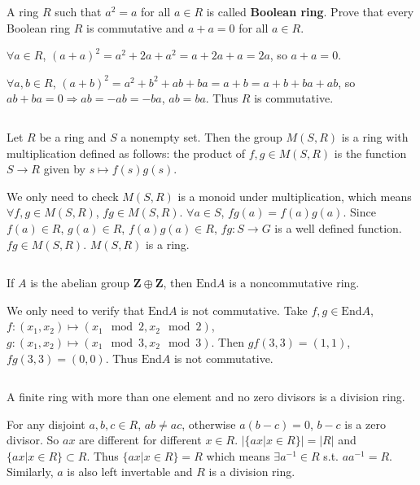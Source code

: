 $$ $$

\begin{ex}
    A ring $R$ such that $a^{2}=a$ for all $a\in R$ is called \textbf{Boolean ring}. Prove that every Boolean ring $R$ is commutative and $a+a=0$ for all $a\in R$.
\end{ex}

\begin{answer}
    $\forall a\in R$, $(a+a)^{2}=a^{2}+2a+a^{2}=a+2a+a=2a$, so $a+a=0$.

    $\forall a,b \in R$, $(a+b)^{2}=a^{2}+b^{2}+ab+ba=a+b=a+b+ba+ab$, so $ab+ba=0\Rightarrow ab=-ab=-ba$, $ab=ba$. Thus $R$ is commutative.
\end{answer}

$$ $$

\begin{ex}
    Let $R$ be a ring and $S$ a nonempty set. Then the group $M(S,R)$ is a ring with multiplication defined as follows: the product of $f, g\in M(S,R)$ is the function $S\to R$ given by $s\mapsto f(s)g(s)$.
\end{ex}

\begin{answer}
    We only need to check $M(S,R)$ is a monoid under multiplication, which means $\forall f,g\in M(S,R)$, $fg\in M(S,R)$. $\forall a\in S$, $fg(a)=f(a)g(a)$. Since $f(a)\in R$, $g(a)\in R$, $f(a)g(a)\in R$, $fg:S\to G$ is a  well defined function. $fg\in M(S,R)$. $M(S,R)$ is a ring.
\end{answer}

$$ $$

\begin{ex}
    If $A$ is the abelian group $\mathbf{Z}\oplus \mathbf{Z}$, then $\mathrm{End} A$ is a noncommutative ring.
\end{ex}

\begin{answer}
    We only need to verify that $\mathrm{End} A$ is not commutative. Take $f,g\in \mathrm{End}A$, $f:(x_{1},x_{2})\mapsto (x_{1}\mod 2, x_{2}\mod 2)$, $g:(x_{1}, x_{2})\mapsto (x_{1}\mod 3, x_{2}\mod 3)$. Then $gf(3,3)=(1,1)$, $fg(3,3)=(0,0)$. Thus $\mathrm{End} A$ is not commutative.
\end{answer}

$$ $$

\begin{ex}
    A finite ring with more than one element and no zero divisors is a division ring.
\end{ex}

\begin{answer}
    For any disjoint $a,b,c\in R$, $ab\neq ac$, otherwise $a(b-c)=0$, $b-c$ is a zero divisor. So $ax$ are different for different $x\in R$. $\left| \{ax|x\in R\} \right| =\left| R \right| $ and $\{ax|x\in R\}\subset R$. Thus $\{ax|x\in R\}=R$ which means $\exists a^{-1}\in R$ s.t. $aa^{-1}=R$. Similarly, $a$ is also left invertable and $R$ is a division ring.
\end{answer}

